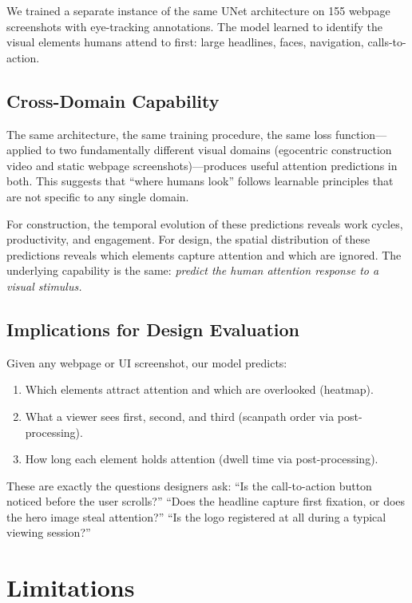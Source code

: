\documentclass{article}
\begin{document}
We trained a separate instance of the same UNet architecture on 155 webpage screenshots with eye-tracking annotations. The model learned to identify the visual elements humans attend to first: large headlines, faces, navigation, calls-to-action.

\subsection{Cross-Domain Capability}

The same architecture, the same training procedure, the same loss function---applied to two fundamentally different visual domains (egocentric construction video and static webpage screenshots)---produces useful attention predictions in both. This suggests that ``where humans look'' follows learnable principles that are not specific to any single domain.

For construction, the temporal evolution of these predictions reveals work cycles, productivity, and engagement. For design, the spatial distribution of these predictions reveals which elements capture attention and which are ignored. The underlying capability is the same: \textit{predict the human attention response to a visual stimulus.}

\subsection{Implications for Design Evaluation}

Given any webpage or UI screenshot, our model predicts:
\begin{enumerate}
    \item Which elements attract attention and which are overlooked (heatmap).
    \item What a viewer sees first, second, and third (scanpath order via post-processing).
    \item How long each element holds attention (dwell time via post-processing).
\end{enumerate}

These are exactly the questions designers ask: ``Is the call-to-action button noticed before the user scrolls?'' ``Does the headline capture first fixation, or does the hero image steal attention?'' ``Is the logo registered at all during a typical viewing session?''

\section{Limitations}
\end{document}
